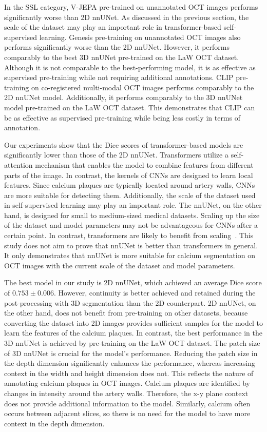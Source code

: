 \documentclass[a4paper,11pt,oneside]{report}
\begin{document}
In the SSL category, V-JEPA pre-trained on unannotated OCT images performs significantly worse than 2D nnUNet. As discussed in the previous section, the scale of the dataset may play an important role in transformer-based self-supervised learning. Genesis pre-training on unannotated OCT images also performs significantly worse than the 2D nnUNet. However, it performs comparably to the best 3D nnUNet pre-trained on the LaW OCT dataset. Although it is not comparable to the best-performing model, it is as effective as supervised pre-training while not requiring additional annotations. CLIP pre-training on co-registered multi-modal OCT images performs comparably to the 2D nnUNet model. Additionally, it performs comparably to the 3D nnUNet model pre-trained on the LaW OCT dataset. This demonstrates that CLIP can be as effective as supervised pre-training while being less costly in terms of annotation.

Our experiments show that the Dice scores of transformer-based models are significantly lower than those of the 2D nnUNet. Transformers utilize a self-attention mechanism that enables the model to combine features from different parts of the image. In contrast, the kernels of CNNs are designed to learn local features. Since calcium plaques are typically located around artery walls, CNNs are more suitable for detecting them. Additionally, the scale of the dataset used in self-supervised learning may play an important role. The nnUNet, on the other hand, is designed for small to medium-sized medical datasets. Scaling up the size of the dataset and model parameters may not be advantageous for CNNs after a certain point. In contrast, transformers are likely to benefit from scaling~\cite{Zhai2021}. This study does not aim to prove that nnUNet is better than transformers in general. It only demonstrates that nnUNet is more suitable for calcium segmentation on OCT images with the current scale of the dataset and model parameters.

The best model in our study is 2D nnUNet, which achieved an average Dice score of $0.753\pm0.006$. However, continuity is better achieved and retained during the post-processing with 3D segmentation than the 2D counterpart. 2D nnUNet, on the other hand, does not benefit from pre-training on other datasets, because converting the dataset into 2D images provides sufficient samples for the model to learn the features of the calcium plaques. In contrast, the best performance in the 3D nnUNet is achieved by pre-training on the LaW OCT dataset. The patch size of 3D nnUNet is crucial for the model's performance. Reducing the patch size in the depth dimension significantly enhances the performance, whereas increasing context in the width and height dimension does not. This reflects the nature of annotating calcium plaques in OCT images. Calcium plaques are identified by changes in intensity around the artery walls. Therefore, the x-y plane context does not provide additional information to the model. Similarly, calcium often occurs between adjacent slices, so there is no need for the model to have more context in the depth dimension.
\end{document}

